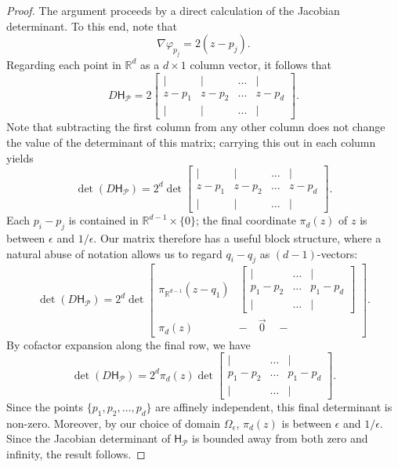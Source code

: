 \documentclass[12pt]{amsart}
\theoremstyle{definition}
\numberwithin{equation}{section}
\begin{document}
\begin{proof}
The argument proceeds by a direct calculation of the Jacobian determinant. To this end, note that
$$\nabla \varphi_{p_j} = 2 (z - p_j).$$
Regarding each point in $\mathbb{R}^d$ as a $d \times 1$ column vector, it follows that
$$D\mathsf{H}_{\mathcal{P}} = 2 \begin{bmatrix} | & | & \dots & | \\ z - p_1 & z - p_2 & \dots & z - p_d \\
| & | & \dots & |\end{bmatrix}.$$
Note that subtracting the first column from any other column does not change the value of the determinant of this matrix; carrying this out in each column yields
$$\det(D\mathsf{H}_{\mathcal{P}}) = 2^d \det \begin{bmatrix}
    | & | & \dots & | \\ 
    z - p_1 & z - p_2 & \dots & z - p_d \\
    | & | & \dots & |
\end{bmatrix}.$$
Each $p_i - p_j$ is contained in $\mathbb{R}^{d - 1} \times \{0\}$; the final coordinate $\pi_d(z)$ of $z$ is between $\epsilon$ and $1/\epsilon$. Our matrix therefore has a useful block structure, where a natural abuse of notation allows us to regard $q_i - q_j$ as $(d - 1)$-vectors:
$$\det(D\mathsf{H}_{\mathcal{P}}) = 2^d \det \begin{bmatrix}
    \pi_{\mathbb{R}^{d - 1}}(z - q_1) & \begin{bmatrix} | & \dots & | \\ p_1 - p_2 & \dots & p_1 - p_d \\ | & \dots & |\end{bmatrix} \\ \pi_d(z) & - \quad \vec 0 \quad - 
\end{bmatrix}.$$
By cofactor expansion along the final row, we have
$$\det(D\mathsf{H}_{\mathcal P}) = 2^d \pi_d(z) \det
\begin{bmatrix} | & \dots & | \\ p_1 - p_2 & \dots & p_1 - p_d \\ | & \dots & |\end{bmatrix}.
$$
Since the points $\{p_1, p_2, \dots, p_d\}$ are affinely independent, this final determinant is non-zero. Moreover, by our choice of domain $\Omega_{\epsilon}$, $\pi_d(z)$ is between $\epsilon$ and $1/\epsilon$. Since the Jacobian determinant of $\mathsf{H}_{\mathcal{P}}$ is bounded away from both zero and infinity, the result follows. 
\end{proof}
\end{document}
